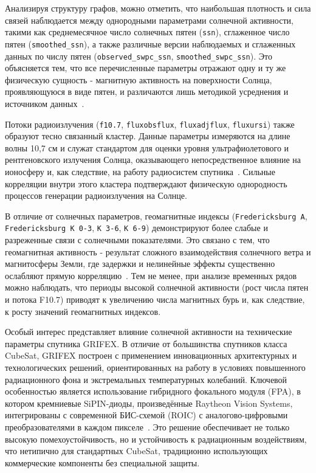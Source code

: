 Анализируя структуру графов, можно отметить, что наибольшая плотность и сила связей наблюдается между однородными параметрами солнечной активности, такими как среднемесячное число солнечных пятен (\texttt{ssn}), сглаженное число пятен (\texttt{smoothed\_ssn}), а также различные версии наблюдаемых и сглаженных данных по числу пятен (\texttt{observed\_swpc\_ssn}, \texttt{smoothed\_swpc\_ssn}). Это объясняется тем, что все перечисленные параметры отражают одну и ту же физическую сущность - магнитную активность на поверхности Солнца, проявляющуюся в виде пятен, и различаются лишь методикой усреднения и источником данных~\cite{sidc_manual}.

Потоки радиоизлучения (\texttt{f10.7}, \texttt{fluxobsflux}, \texttt{fluxadjflux}, \texttt{fluxursi}) также образуют тесно связанный кластер. Данные параметры измеряются на длине волны 10,7 см и служат стандартом для оценки уровня ультрафиолетового и рентгеновского излучения Солнца, оказывающего непосредственное влияние на ионосферу и, как следствие, на работу радиосистем спутника~\cite{f107_standard}. Сильные корреляции внутри этого кластера подтверждают физическую однородность процессов генерации радиоизлучения на Солнце.

В отличие от солнечных параметров, геомагнитные индексы (\texttt{Fredericksburg A}, \texttt{Fredericksburg K 0-3}, \texttt{K 3-6}, \texttt{K 6-9}) демонстрируют более слабые и разреженные связи с солнечными показателями. Это связано с тем, что геомагнитная активность - результат сложного взаимодействия солнечного ветра и магнитосферы Земли, где задержки и нелинейные эффекты существенно ослабляют прямую корреляцию~\cite{geomag_handbook}. Тем не менее, при анализе временных рядов можно наблюдать, что периоды высокой солнечной активности (рост числа пятен и потока F10.7) приводят к увеличению числа магнитных бурь и, как следствие, к росту значений геомагнитных индексов.


Особый интерес представляет влияние солнечной активности на технические параметры спутника GRIFEX. В отличие от большинства спутников класса CubeSat, GRIFEX построен с применением инновационных архитектурных и технологических решений, ориентированных на работу в условиях повышенного радиационного фона и экстремальных температурных колебаний. Ключевой особенностью является использование гибридного фокального модуля (FPA), в котором кремниевые SiPIN-диоды, произведённые Raytheon Vision Systems, интегрированы с современной БИС-схемой (ROIC) с аналогово-цифровыми преобразователями в каждом пикселе~\cite{norton2012spaceborne, eoportal_grifex}. Это решение обеспечивает не только высокую помехоустойчивость, но и устойчивость к радиационным воздействиям, что нетипично для стандартных CubeSat, традиционно использующих коммерческие компоненты без специальной защиты.

